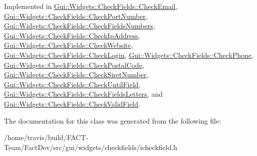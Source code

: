 Implemented in \hyperlink{classGui_1_1Widgets_1_1CheckFields_1_1CheckEmail_a166b7e7d39ca307a52477b2d9ef65ef1}{Gui\-::\-Widgets\-::\-Check\-Fields\-::\-Check\-Email}, \hyperlink{classGui_1_1Widgets_1_1CheckFields_1_1CheckPortNumber_aca2bfa31e06451c77a7a38020c2819b7}{Gui\-::\-Widgets\-::\-Check\-Fields\-::\-Check\-Port\-Number}, \hyperlink{classGui_1_1Widgets_1_1CheckFields_1_1CheckFieldsNumbers_ade88f674fc2cbbeb514cdf81c0f63487}{Gui\-::\-Widgets\-::\-Check\-Fields\-::\-Check\-Fields\-Numbers}, \hyperlink{classGui_1_1Widgets_1_1CheckFields_1_1CheckIpAddress_a785f3ccf0fba4db3e83bfaaaea37455e}{Gui\-::\-Widgets\-::\-Check\-Fields\-::\-Check\-Ip\-Address}, \hyperlink{classGui_1_1Widgets_1_1CheckFields_1_1CheckWebsite_ad2f5e53b88ca8740fd248dcaab0439bd}{Gui\-::\-Widgets\-::\-Check\-Fields\-::\-Check\-Website}, \hyperlink{classGui_1_1Widgets_1_1CheckFields_1_1CheckLogin_a66e6d426253b5219a55b7ccada37d9b9}{Gui\-::\-Widgets\-::\-Check\-Fields\-::\-Check\-Login}, \hyperlink{classGui_1_1Widgets_1_1CheckFields_1_1CheckPhone_a15e8da6b25e752c6fb816e6655bdb062}{Gui\-::\-Widgets\-::\-Check\-Fields\-::\-Check\-Phone}, \hyperlink{classGui_1_1Widgets_1_1CheckFields_1_1CheckPostalCode_a27abf247ec158aafb2c13779f6630449}{Gui\-::\-Widgets\-::\-Check\-Fields\-::\-Check\-Postal\-Code}, \hyperlink{classGui_1_1Widgets_1_1CheckFields_1_1CheckSiretNumber_a973f81b959d34b28818159303932f5f8}{Gui\-::\-Widgets\-::\-Check\-Fields\-::\-Check\-Siret\-Number}, \hyperlink{classGui_1_1Widgets_1_1CheckFields_1_1CheckUntilField_ad8d3923aa32bbcba0d73bb4240fe96e8}{Gui\-::\-Widgets\-::\-Check\-Fields\-::\-Check\-Until\-Field}, \hyperlink{classGui_1_1Widgets_1_1CheckFields_1_1CheckFieldsLetters_a95f6808ecc2cedf22407fc1791827851}{Gui\-::\-Widgets\-::\-Check\-Fields\-::\-Check\-Fields\-Letters}, and \hyperlink{classGui_1_1Widgets_1_1CheckFields_1_1CheckValidField_a871d7b28becd80aac9fc75a2057bb15d}{Gui\-::\-Widgets\-::\-Check\-Fields\-::\-Check\-Valid\-Field}.



The documentation for this class was generated from the following file\-:\begin{DoxyCompactItemize}
\item 
/home/travis/build/\-F\-A\-C\-T-\/\-Team/\-Fact\-Dev/src/gui/widgets/checkfields/icheckfield.\-h\end{DoxyCompactItemize}
